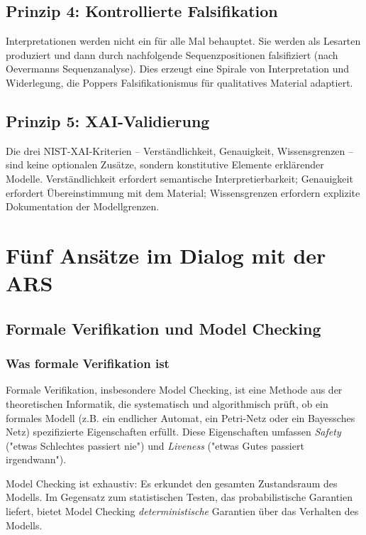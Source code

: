 \documentclass[12pt,a4paper]{article}
\begin{document}
\subsection{Prinzip 4: Kontrollierte Falsifikation}

Interpretationen werden nicht ein für alle Mal behauptet. Sie werden als 
Lesarten produziert und dann durch nachfolgende Sequenzpositionen falsifiziert 
(nach Oevermanns Sequenzanalyse). Dies erzeugt eine Spirale von Interpretation 
und Widerlegung, die Poppers Falsifikationismus für qualitatives Material 
adaptiert.

\subsection{Prinzip 5: XAI-Validierung}

Die drei NIST-XAI-Kriterien – Verständlichkeit, Genauigkeit, Wissensgrenzen – 
sind keine optionalen Zusätze, sondern konstitutive Elemente erklärender 
Modelle. Verständlichkeit erfordert semantische Interpretierbarkeit; Genauigkeit 
erfordert Übereinstimmung mit dem Material; Wissensgrenzen erfordern explizite 
Dokumentation der Modellgrenzen.

\section{Fünf Ansätze im Dialog mit der ARS}

\subsection{Formale Verifikation und Model Checking}

\subsubsection{Was formale Verifikation ist}

Formale Verifikation, insbesondere Model Checking, ist eine Methode aus der 
theoretischen Informatik, die systematisch und algorithmisch prüft, ob ein 
formales Modell (z.B. ein endlicher Automat, ein Petri-Netz oder ein Bayessches 
Netz) spezifizierte Eigenschaften erfüllt. Diese Eigenschaften umfassen 
\textit{Safety} ("etwas Schlechtes passiert nie") und \textit{Liveness} 
("etwas Gutes passiert irgendwann").

Model Checking ist exhaustiv: Es erkundet den gesamten Zustandsraum des Modells. 
Im Gegensatz zum statistischen Testen, das probabilistische Garantien liefert, 
bietet Model Checking \textit{deterministische} Garantien über das Verhalten 
des Modells.
\end{document}
